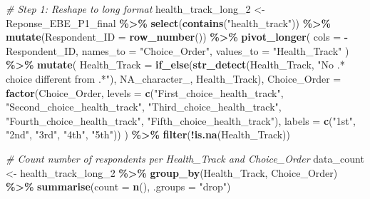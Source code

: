 \documentclass[
]{article}
\newenvironment{Shaded}{\begin{snugshade}}{\end{snugshade}}
\newcommand{\AttributeTok}[1]{\textcolor[rgb]{0.13,0.29,0.53}{#1}}
\newcommand{\CommentTok}[1]{\textcolor[rgb]{0.56,0.35,0.01}{\textit{#1}}}
\newcommand{\ConstantTok}[1]{\textcolor[rgb]{0.56,0.35,0.01}{#1}}
\newcommand{\FunctionTok}[1]{\textcolor[rgb]{0.13,0.29,0.53}{\textbf{#1}}}
\newcommand{\NormalTok}[1]{#1}
\newcommand{\OtherTok}[1]{\textcolor[rgb]{0.56,0.35,0.01}{#1}}
\newcommand{\SpecialCharTok}[1]{\textcolor[rgb]{0.81,0.36,0.00}{\textbf{#1}}}
\newcommand{\StringTok}[1]{\textcolor[rgb]{0.31,0.60,0.02}{#1}}
\begin{document}
\begin{Shaded}
\begin{Highlighting}[]
\CommentTok{\# Step 1: Reshape to long format}
\NormalTok{  health\_track\_long\_2 }\OtherTok{\textless{}{-}}\NormalTok{ Reponse\_EBE\_P1\_final }\SpecialCharTok{\%\textgreater{}\%}
  \FunctionTok{select}\NormalTok{(}\FunctionTok{contains}\NormalTok{(}\StringTok{"health\_track"}\NormalTok{)) }\SpecialCharTok{\%\textgreater{}\%}
  \FunctionTok{mutate}\NormalTok{(}\AttributeTok{Respondent\_ID =} \FunctionTok{row\_number}\NormalTok{()) }\SpecialCharTok{\%\textgreater{}\%}
  \FunctionTok{pivot\_longer}\NormalTok{(}
    \AttributeTok{cols =} \SpecialCharTok{{-}}\NormalTok{Respondent\_ID,}
    \AttributeTok{names\_to =} \StringTok{"Choice\_Order"}\NormalTok{,}
    \AttributeTok{values\_to =} \StringTok{"Health\_Track"}
\NormalTok{  ) }\SpecialCharTok{\%\textgreater{}\%}
  \FunctionTok{mutate}\NormalTok{(}
    \AttributeTok{Health\_Track =} \FunctionTok{if\_else}\NormalTok{(}\FunctionTok{str\_detect}\NormalTok{(Health\_Track, }\StringTok{"No .* choice different from .*"}\NormalTok{),}
                           \ConstantTok{NA\_character\_}\NormalTok{,}
\NormalTok{                           Health\_Track),}
    \AttributeTok{Choice\_Order =} \FunctionTok{factor}\NormalTok{(Choice\_Order,}
                          \AttributeTok{levels =} \FunctionTok{c}\NormalTok{(}\StringTok{"First\_choice\_health\_track"}\NormalTok{,}
                                     \StringTok{"Second\_choice\_health\_track"}\NormalTok{,}
                                     \StringTok{"Third\_choice\_health\_track"}\NormalTok{,}
                                     \StringTok{"Fourth\_choice\_health\_track"}\NormalTok{,}
                                     \StringTok{"Fifth\_choice\_health\_track"}\NormalTok{),}
                          \AttributeTok{labels =} \FunctionTok{c}\NormalTok{(}\StringTok{"1st"}\NormalTok{, }\StringTok{"2nd"}\NormalTok{, }\StringTok{"3rd"}\NormalTok{, }\StringTok{"4th"}\NormalTok{, }\StringTok{"5th"}\NormalTok{))}
\NormalTok{  ) }\SpecialCharTok{\%\textgreater{}\%}
  \FunctionTok{filter}\NormalTok{(}\SpecialCharTok{!}\FunctionTok{is.na}\NormalTok{(Health\_Track))}

\CommentTok{\# Count number of respondents per Health\_Track and Choice\_Order}
\NormalTok{data\_count }\OtherTok{\textless{}{-}}\NormalTok{ health\_track\_long\_2 }\SpecialCharTok{\%\textgreater{}\%}
  \FunctionTok{group\_by}\NormalTok{(Health\_Track, Choice\_Order) }\SpecialCharTok{\%\textgreater{}\%}
  \FunctionTok{summarise}\NormalTok{(}\AttributeTok{count =} \FunctionTok{n}\NormalTok{(), }\AttributeTok{.groups =} \StringTok{"drop"}\NormalTok{)}


\end{Highlighting}
\end{Shaded}
\end{document}
